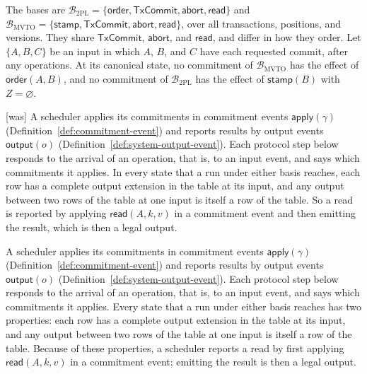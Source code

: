 \documentclass[sigconf]{cidr-2027}
\theoremstyle{remark}
\newcommand{\commitment}{commitment\xspace}
\newcommand{\commitments}{commitments\xspace}
\newcommand{\outnoun}{output extension\xspace}%
\begin{document}
The bases are
$\mathcal B_{\mathrm{2PL}}=\{\mathsf{order},\mathsf{TxCommit},\mathsf{abort},\mathsf{read}\}$
and
$\mathcal B_{\mathrm{MVTO}}=\{\mathsf{stamp},\mathsf{TxCommit},\mathsf{abort},\mathsf{read}\}$,
over all transactions, positions, and versions.  They share
$\mathsf{TxCommit}$, $\mathsf{abort}$, and $\mathsf{read}$, and differ in how
they order.  Let $\{A,B,C\}$ be an input in which $A$, $B$, and $C$ have each
requested commit, after any operations.  At its canonical state, no \commitment
of $\mathcal B_{\mathrm{MVTO}}$ has the effect of $\mathsf{order}(A,B)$, and no
\commitment of $\mathcal B_{\mathrm{2PL}}$ has the effect of $\mathsf{stamp}(B)$
with $Z=\varnothing$.



{\footnotesize\color{black!50}\noindent\textsf{[was]} A scheduler applies its \commitments in \commitment events
$\mathsf{apply}(\gamma)$ (Definition~\ref{def:commitment-event}) and reports
results by output events $\mathsf{output}(o)$
(Definition~\ref{def:system-output-event}).  Each protocol step below responds to
the arrival of an operation, that is, to an input event, and says which
\commitments it applies.  In every state that a run under either basis reaches,
each row has a complete \outnoun in the table at its input, and any output
between two rows of the table at one input is itself a row of the table.  So a
read is reported by applying $\mathsf{read}(A,k,v)$ in a \commitment event and
then emitting the result, which is then a legal output.\par}

\color{blue!70!black}A scheduler applies its \commitments in \commitment events
$\mathsf{apply}(\gamma)$ (Definition~\ref{def:commitment-event}) and reports
results by output events $\mathsf{output}(o)$
(Definition~\ref{def:system-output-event}).  Each protocol step below responds to
the arrival of an operation, that is, to an input event, and says which
\commitments it applies.  Every state that a run under either basis reaches
has two properties: each row has a complete \outnoun in the table at its
input, and any output between two rows of the table at one input is itself a
row of the table.  Because of these properties, a scheduler reports a read by
first applying $\mathsf{read}(A,k,v)$ in a \commitment event; emitting the
result is then a legal output.\color{black}
\end{document}
